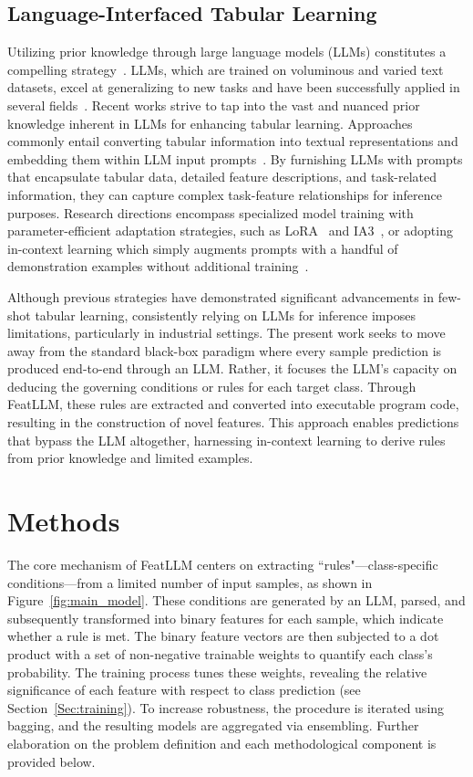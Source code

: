 \subsection{Language-Interfaced Tabular Learning} Utilizing prior knowledge through large language models (LLMs) constitutes a compelling strategy~\cite{anil2023palm,openai2023gpt4}. LLMs, which are trained on voluminous and varied text datasets, excel at generalizing to new tasks and have been successfully applied in several fields~\cite{brown2020language}. Recent works strive to tap into the vast and nuanced prior knowledge inherent in LLMs for enhancing tabular learning. Approaches commonly entail converting tabular information into textual representations and embedding them within LLM input prompts~\cite{dinh2022lift,hegselmann2023tabllm,wang2023anypredict}. By furnishing LLMs with prompts that encapsulate tabular data, detailed feature descriptions, and task-related information, they can capture complex task-feature relationships for inference purposes. Research directions encompass specialized model training with parameter-efficient adaptation strategies, such as LoRA~\cite{hu2021lora} and IA3~\cite{liu2022few}, or adopting in-context learning which simply augments prompts with a handful of demonstration examples without additional training~\cite{dinh2022lift,hegselmann2023tabllm,nam2023semi,slack2023tablet}.

Although previous strategies have demonstrated significant advancements in few-shot tabular learning, consistently relying on LLMs for inference imposes limitations, particularly in industrial settings. The present work seeks to move away from the standard black-box paradigm where every sample prediction is produced end-to-end through an LLM. Rather, it focuses the LLM's capacity on deducing the governing conditions or rules for each target class. Through \textsf{FeatLLM}, these rules are extracted and converted into executable program code, resulting in the construction of novel features. This approach enables predictions that bypass the LLM altogether, harnessing in-context learning to derive rules from prior knowledge and limited examples.

\section{Methods}
The core mechanism of \textsf{FeatLLM} centers on extracting ``rules"—class-specific conditions—from a limited number of input samples, as shown in Figure~\ref{fig:main_model}. These conditions are generated by an LLM, parsed, and subsequently transformed into binary features for each sample, which indicate whether a rule is met. The binary feature vectors are then subjected to a dot product with a set of non-negative trainable weights to quantify each class's probability. The training process tunes these weights, revealing the relative significance of each feature with respect to class prediction (see Section~\ref{Sec:training}). To increase robustness, the procedure is iterated using bagging, and the resulting models are aggregated via ensembling. Further elaboration on the problem definition and each methodological component is provided below.

